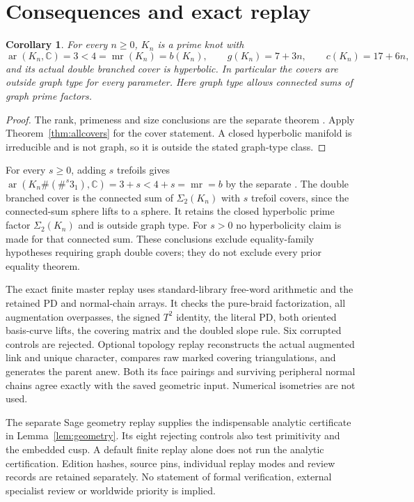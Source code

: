 \documentclass[11pt]{article}
\newtheorem{corollary}[theorem]{Corollary}
\newcommand{\mr}{\operatorname{mr}}
\newcommand{\ar}{\operatorname{ar}}
\newcommand{\Sig}{\Sigma_2}
\begin{document}
\section{Consequences and exact replay}

\begin{corollary}\label{cor:family}
For every $n\ge0$, $K_n$ is a prime knot with
\[
 \ar(K_n,\mathbb C)=3<4=\mr(K_n)=b(K_n),\qquad
 g(K_n)=7+3n,\qquad c(K_n)=17+6n,
\]
and its actual double branched cover is hyperbolic.
In particular the covers are outside graph type for every parameter.
Here graph type allows connected sums of graph prime factors.
\end{corollary}
\begin{proof}
The rank, primeness and size conclusions are the separate theorem
\cite[Theorem \texttt{thm:main}]{family}. Apply
Theorem~\ref{thm:allcovers} for the cover statement. A closed
hyperbolic manifold is irreducible and is not graph, so it is
outside the stated graph-type class.
\end{proof}

For every $s\ge0$, adding $s$ trefoils gives
$\ar(K_n\#(\#^s3_1),\mathbb C)=3+s<4+s=\mr=b$ by the separate
\cite[Corollary \texttt{cor:sums}]{family}. The double branched cover
is the connected sum of $\Sig(K_n)$ with $s$ trefoil covers, since
the connected-sum sphere lifts to a sphere. It retains the closed
hyperbolic prime factor $\Sig(K_n)$ and is outside graph type.
For $s>0$ no hyperbolicity claim is made for that connected sum.
These conclusions exclude equality-family hypotheses requiring graph
double covers; they do not exclude every prior equality theorem.

The exact finite master replay uses standard-library free-word
arithmetic and the retained PD and normal-chain arrays. It checks the
pure-braid factorization, all augmentation overpasses, the signed
$T^2$ identity, the literal PD, both oriented basis-curve lifts,
the covering matrix and the doubled slope rule. Six corrupted controls
are rejected. Optional topology replay reconstructs the actual
augmented link and unique character, compares raw marked covering
triangulations, and generates the parent anew. Both its face pairings
and surviving peripheral normal chains agree exactly with the saved
geometric input. Numerical isometries are not used.

The separate Sage geometry replay supplies the indispensable analytic
certificate in Lemma~\ref{lem:geometry}. Its eight rejecting controls
also test primitivity and the embedded cusp. A default finite replay
alone does not run the analytic certification. Edition hashes,
source pins, individual replay modes and review records are retained
separately. No statement of formal verification, external specialist
review or worldwide priority is implied.
\end{document}

